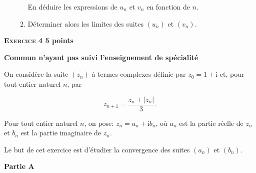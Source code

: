 \documentclass[10pt]{article}
\begin{document}
\begin{enumerate}
\begin{enumerate}
En déduire les expressions de $u_n$ et $v_n$ en fonction de $n$.
		\item Déterminer alors les limites des suites $\left(u_n\right)$ et $\left(v_n\right)$.
	\end{enumerate}
\end{enumerate}

\vspace{0,5cm}

\textbf{\textsc{Exercice 4} \hfill 5 points}
 
\textbf{Commun n'ayant pas suivi l'enseignement de spécialité}

\medskip

On considère la suite $\left(z_n\right)$ à termes complexes définie par $z_0 = 1 + \text{i}$ et, pour tout entier naturel $n$, par

\[z_{n+1} = \dfrac{z_n + \left|z_n\right|}{3}.\]

Pour tout entier naturel $n$, on pose: $z_n = a_n + \text{i}b_n$, où $a_n$ est la partie réelle de $z_n$ et $b_n$ est la partie imaginaire de $z_n$.

Le but de cet exercice est d'étudier la convergence des suites $\left(a_n\right)$ et $\left(b_n\right)$.

\smallskip

\textbf{Partie A}

\smallskip
\end{document}
